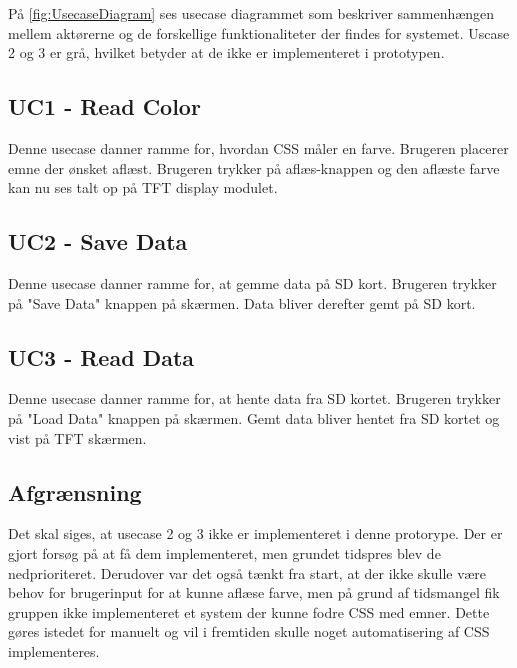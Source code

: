 På \autoref{fig:UsecaseDiagram} ses usecase diagrammet som beskriver sammenhængen mellem aktørerne og de forskellige funktionaliteter der findes for systemet. Uscase 2 og 3 er grå, hvilket betyder at de ikke er implementeret i prototypen. 

\subsection{UC1 - Read Color}
Denne usecase danner ramme for, hvordan CSS måler en farve. Brugeren placerer emne der ønsket aflæst. Brugeren trykker på aflæs-knappen og den aflæste farve kan nu ses talt op på TFT display modulet.

\subsection{UC2 - Save Data}
Denne usecase danner ramme for, at gemme data på SD kort. Brugeren trykker på "Save Data" knappen på skærmen. Data bliver derefter gemt på SD kort.

\subsection{UC3 - Read Data}
Denne usecase danner ramme for, at hente data fra SD kortet. Brugeren trykker på "Load Data" knappen på skærmen. Gemt data bliver hentet fra SD kortet og vist på TFT skærmen.

\subsection{Afgrænsning}
Det skal siges, at usecase 2 og 3 ikke er implementeret i denne protorype. Der er gjort forsøg på at få dem implementeret, men grundet tidspres blev de nedprioriteret. Derudover var det også tænkt fra start, at der ikke skulle være behov for brugerinput for at kunne aflæse farve, men på grund af tidsmangel fik gruppen ikke implementeret et system der kunne fodre CSS med emner. Dette gøres istedet for manuelt og vil i fremtiden skulle noget automatisering af CSS implementeres.

